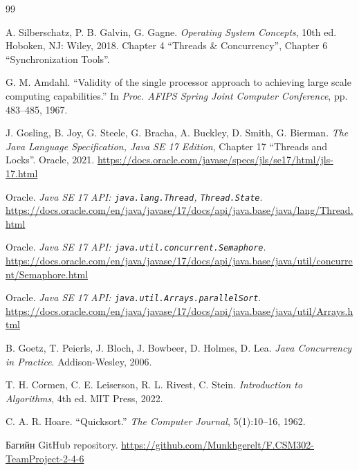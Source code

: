 \begin{thebibliography}{99}

A. Silberschatz, P. B. Galvin, G. Gagne.
\emph{Operating System Concepts}, 10th ed. Hoboken, NJ: Wiley, 2018.
Chapter 4 “Threads \& Concurrency”, Chapter 6 “Synchronization Tools”.

G. M. Amdahl. “Validity of the single processor approach to achieving large scale computing capabilities.”
In \emph{Proc. AFIPS Spring Joint Computer Conference}, pp. 483--485, 1967.

J. Gosling, B. Joy, G. Steele, G. Bracha, A. Buckley, D. Smith, G. Bierman.
\emph{The Java Language Specification, Java SE 17 Edition}, Chapter 17 “Threads and Locks”. Oracle, 2021.
\url{https://docs.oracle.com/javase/specs/jls/se17/html/jls-17.html}

Oracle. \emph{Java SE 17 API: \texttt{java.lang.Thread}, \texttt{Thread.State}}.
\url{https://docs.oracle.com/en/java/javase/17/docs/api/java.base/java/lang/Thread.html}

Oracle. \emph{Java SE 17 API: \texttt{java.util.concurrent.Semaphore}}.
\url{https://docs.oracle.com/en/java/javase/17/docs/api/java.base/java/util/concurrent/Semaphore.html}

Oracle. \emph{Java SE 17 API: \texttt{java.util.Arrays.parallelSort}}.
\url{https://docs.oracle.com/en/java/javase/17/docs/api/java.base/java/util/Arrays.html}

B. Goetz, T. Peierls, J. Bloch, J. Bowbeer, D. Holmes, D. Lea.
\emph{Java Concurrency in Practice}. Addison-Wesley, 2006.

T. H. Cormen, C. E. Leiserson, R. L. Rivest, C. Stein.
\emph{Introduction to Algorithms}, 4th ed. MIT Press, 2022.

C. A. R. Hoare. “Quicksort.” \emph{The Computer Journal}, 5(1):10--16, 1962.

Багийн GitHub repository. \url{https://github.com/Munkhgerelt/F.CSM302-TeamProject-2-4-6}

\end{thebibliography}
